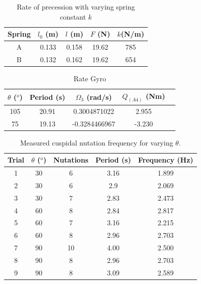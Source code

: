 \documentclass[8pt]{article}
\begin{document}
\begin{table}[H]
    \centering
    \begin{tabular}{|c|c|c|c|c|}
        \hline
        Spring & $l_0$ (m) & $l$ (m) & $F$ (N) & $k$(N/m)\\
        \hline
        A	& 0.133	& 0.158	& 19.62	& 785 \\
        B	& 0.132	& 0.162	& 19.62	& 654 \\
        \hline
    \end{tabular}
    \caption{Rate of precession with varying spring constant $k$}
    \label{tab:springs}
\end{table}

\begin{table}[H]
    \centering
    \begin{tabular}{|c|c|c|c|c|}
        \hline
        $\theta$ ($^o$) & Period (s) & $\Omega_3$ (rad/s) &  $Q_{(A4)}$ (Nm)\\
        \hline
        105	& 20.91	& 0.3004871022  &	2.955 \\
        75	& 19.13	& -0.3284466967	&   -3.230 \\
        \hline
    \end{tabular}
    \caption{Rate Gyro}
    \label{tab:precession_vs_k}
\end{table}


\begin{table}[H]
    \centering
    \begin{tabular}{|c|c|c|c|c|}
        \hline
        Trial & $\theta$ ($^o$) & Nutations  & Period (s) & Frequency (Hz)\\
        \hline
        1   & 30	& 6	    &   3.16	& 1.899 \\
        2   & 30    & 6	    &   2.9	    & 2.069 \\
        3   & 30    & 7	    &   2.83	& 2.473 \\
        4   & 60	& 8	    &   2.84	& 2.817 \\
        5   & 60    & 7	    &   3.16	& 2.215 \\
        6   & 60    & 8	    &   2.96	& 2.703 \\
        7   & 90	& 10    &   4.00	& 2.500 \\
        8   & 90    & 8	    &   2.96	& 2.703 \\
        9   & 90    & 8	    &   3.09	& 2.589 \\
        \hline
    \end{tabular}
    \caption{Measured cuspidal nutation frequency for varying $\theta$.}
    \label{tab:cuspidal_nutation}
\end{table}
\end{document}
